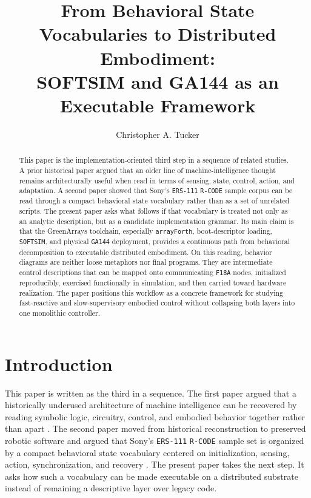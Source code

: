 \documentclass[11pt]{article}
\title{From Behavioral State Vocabularies to Distributed Embodiment:\\
SOFTSIM and GA144 as an Executable Framework}
\author{Christopher A. Tucker}
\date{}
\begin{document}
\maketitle

\begin{abstract}
This paper is the implementation-oriented third step in a sequence of
related studies. A prior historical paper argued that an older line of
machine-intelligence thought remains architecturally useful when read in
terms of sensing, state, control, action, and adaptation. A second paper
showed that Sony's \texttt{ERS-111} \texttt{R-CODE} sample corpus can be
read through a compact behavioral state vocabulary rather than as a set of
unrelated scripts. The present paper asks what follows if that vocabulary is
treated not only as an analytic description, but as a candidate
implementation grammar. Its main claim is that the GreenArrays toolchain,
especially \texttt{arrayForth}, boot-descriptor loading, \texttt{SOFTSIM},
and physical \texttt{GA144} deployment, provides a continuous path from
behavioral decomposition to executable distributed embodiment. On this
reading, behavior diagrams are neither loose metaphors nor final programs.
They are intermediate control descriptions that can be mapped onto
communicating \texttt{F18A} nodes, initialized reproducibly, exercised
functionally in simulation, and then carried toward hardware realization.
The paper positions this workflow as a concrete framework for studying
fast-reactive and slow-supervisory embodied control without collapsing both
layers into one monolithic controller.
\end{abstract}

\onehalfspacing

\section{Introduction}

This paper is written as the third in a sequence. The first paper argued
that a historically underused architecture of machine intelligence can be
recovered by reading symbolic logic, circuitry, control, and embodied
behavior together rather than apart \citep{tucker2026berkeley}. The second
paper moved from historical reconstruction to preserved robotic software
and argued that Sony's \texttt{ERS-111} \texttt{R-CODE} sample set is
organized by a compact behavioral state vocabulary centered on
initialization, sensing, action, synchronization, and recovery
\citep{tucker2026behavioral}. The present paper takes the next step. It
asks how such a vocabulary can be made executable on a distributed
substrate instead of remaining a descriptive layer over legacy code.
\end{document}
